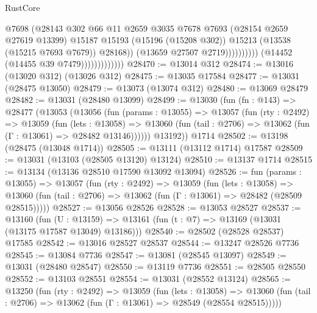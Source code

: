 \begin{lexlean}{RustCore}
\begin{coremodule}
                                              @7698
                                              (@28143
                                                @302
                                                @66
                                                @11
                                                @2659
                                                @3035
                                                @7678
                                                @7693
                                                (@28154 @2659 @27619 @13399)
                                                @15187
                                                @15193
                                                (@15196 (@15208 @302))
                                                @15213
                                                (@13538 (@15215 @7693 @7679))
                                                @28168))
                                            (@13659 @27507 @2719))))))))))
                          (@14452 (@14455 @39 @7479)))))))))))))
@28470 := @13014 @312
@28474 := @13016 (@13020 @312) (@13026 @312)
@28475 := @13035 @17584
@28477 := @13031 (@28475 @13050)
@28479 := @13073 (@13074 @312)
@28480 := @13069 @28479
@28482 := @13031 (@28480 @13099)
@28499 := @13030
    (fun (fn : @143) =>
    @28477
      (@13053
        (@13056
          (fun (params : @13055) =>
          @13057
            (fun (rty : @2492) =>
            @13059
              (fun (lets : @13058) =>
              @13060 (fun (tail : @2706) => @13062 (fun (Γ : @13061) => @28482 @13146))))))
        @13192))
    @1714
@28502 := @13198 (@28475 (@13048 @1714))
@28505 := @13111 (@13112 @1714) @17587
@28509 := @13031 (@13103 (@28505 @13120) @13124)
@28510 := @13137 @1714
@28515 := @13134 (@13136 @28510 @17590 @13092 @13094)
@28526 := fun (params : @13055) =>
  @13057
    (fun (rty : @2492) =>
    @13059
      (fun (lets : @13058) =>
      @13060 (fun (tail : @2706) => @13062 (fun (Γ : @13061) => @28482 (@28509 @28515)))))
@28527 := @13056 @28526
@28528 := @13053 @28527
@28537 := @13160
    (fun (U : @13159) => @13161 (fun (t : @7) => @13169 (@13031 (@13175 @17587 @13049) @13186)))
@28540 := @28502 (@28528 @28537) @17585
@28542 := @13016 @28527 @28537
@28544 := @13247 @28526 @7736
@28545 := @13084 @7736
@28547 := @13081 (@28545 @13097)
@28549 := @13031 (@28480 @28547)
@28550 := @13119 @7736
@28551 := @28505 @28550
@28552 := @13103 @28551
@28554 := @13031 (@28552 @13124)
@28565 := @13250
    (fun (rty : @2492) =>
    @13059
      (fun (lets : @13058) =>
      @13060 (fun (tail : @2706) => @13062 (fun (Γ : @13061) => @28549 (@28554 @28515)))))

\end{coremodule}
\end{lexlean}
